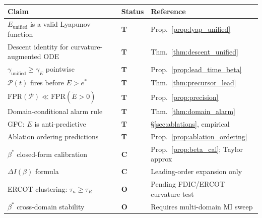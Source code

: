 \documentclass[11pt,a4paper]{article}
\theoremstyle{definition}
\begin{document}
\begin{center}
\renewcommand{\arraystretch}{1.3}
\begin{tabular}{p{5cm}p{2cm}p{5cm}}
\toprule
\textbf{Claim} & \textbf{Status} & \textbf{Reference} \\
\midrule
$E_\mathrm{unified}$ is a valid Lyapunov function & \textbf{T} & Prop.~\ref{prop:lyap_unified} \\
Descent identity for curvature-augmented ODE & \textbf{T} & Thm.~\ref{thm:descent_unified} \\
$\gamma_\mathrm{unified} \geq \gamma_E$ pointwise & \textbf{T} & Prop.~\ref{prop:lead_time_beta} \\
$\mathcal{P}(t)$ fires before $E > e^*$ & \textbf{T} & Thm.~\ref{thm:precursor_lead} \\
$\mathrm{FPR}(\mathcal{P}) \ll \mathrm{FPR}(\dot E > 0)$ & \textbf{T} & Prop.~\ref{prop:precision} \\
Domain-conditional alarm rule & \textbf{T} & Thm.~\ref{thm:domain_alarm} \\
GFC: $E$ is anti-predictive & \textbf{T} & §\ref{sec:ablations}, empirical \\
Ablation ordering predictions & \textbf{T} & Prop.~\ref{prop:ablation_ordering} \\
$\beta^*$ closed-form calibration & \textbf{C} & Prop.~\ref{prop:beta_cal}; Taylor approx \\
$\Delta I(\beta)$ formula & \textbf{C} & Leading-order expansion only \\
ERCOT clustering: $\tau_\kappa \geq \tau_R$ & \textbf{O} & Pending FDIC/ERCOT curvature test \\
$\beta^*$ cross-domain stability & \textbf{O} & Requires multi-domain MI sweep \\
\bottomrule
\end{tabular}
\end{center}
\end{document}
